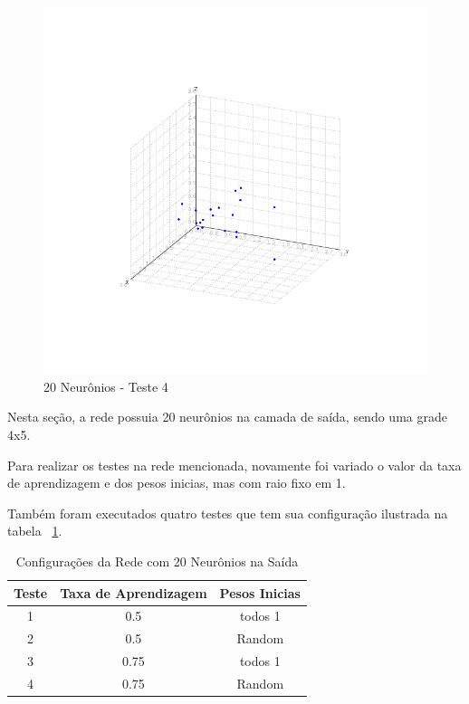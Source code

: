 \begin{figure}[ht!]
	\centering
	\includegraphics[scale=0.4]{./imgs/fig:out_20_teste_4}
	\caption{20 Neurônios - Teste 4}
	\label{fig:out_20_teste_4}
\end{figure}

Nesta seção, a rede possuia 20 neurônios na camada de saída, sendo uma grade 4x5.

Para realizar os testes na rede mencionada, novamente foi variado o valor da taxa de aprendizagem e dos pesos inicias, mas com raio fixo em 1.

Também foram executados quatro testes que tem sua configuração ilustrada na tabela ~\ref{table:dados_20}.
\begin{table}[ht]
\caption{Configurações da Rede com 20 Neurônios na Saída}
\centering
\begin{tabular}{|c|c|c|}  \hline
   Teste 	& Taxa de Aprendizagem 	& Pesos Inicias 	\\ \hline
   1 		& 0.5 				 	& todos 1 			\\ \hline
   2 		& 0.5				 	& Random 			\\ \hline
   3 		& 0.75 				 	& todos 1 			\\ \hline
   4 		& 0.75				 	& Random 			\\ \hline
\end{tabular}
\label{table:dados_20}
\end{table}

